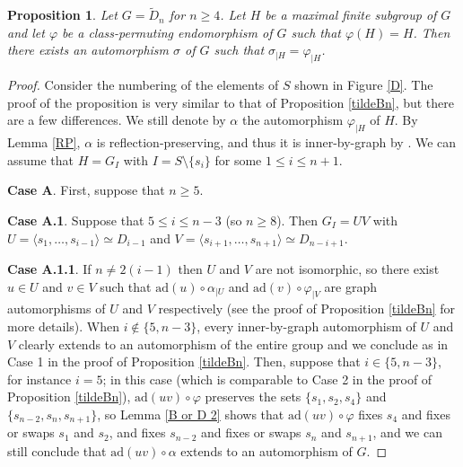 \documentclass[a4paper, 11pt]{amsart}
\newtheorem{prop}[te]{Proposition}
\theoremstyle{definition}
\theoremstyle{remark}
\renewcommand{\leq}{\leqslant}
\renewcommand{\geq}{\geqslant}
\begin{document}

\begin{prop}\label{tildeDn}
Let $G=\tilde{D}_n$ for $n\geq 4$. Let $H$ be a maximal finite subgroup of $G$ and let $\varphi$ be a class-permuting endomorphism of $G$ such that $\varphi(H)=H$. Then there exists an automorphism $\sigma$ of $G$ such that $\sigma_{\vert H}=\varphi_{\vert H}$.
\end{prop}

\begin{proof}
Consider the numbering of the elements of $S$ shown in Figure \ref{D}. The proof of the proposition is very similar to that of Proposition \ref{tildeBn}, but there are a few differences. We still denote by $\alpha$ the automorphism $\varphi_{\vert H}$ of $H$. By Lemma \ref{RP}, $\alpha$ is reflection-preserving, and thus it is inner-by-graph by \cite[Proposition 1.44]{franz}. We can assume that $H=G_I$ with $I= S\setminus \lbrace s_i\rbrace$ for some $1\leq i\leq n+1$. 

\smallskip

\noindent \textbf{Case A}. First, suppose that $n\geq 5$. 

\smallskip

\noindent \textbf{Case A.1}. Suppose that $5\leq i \leq n-3$ (so $n\geq 8$). Then $G_I=UV$ with $U=\langle s_1,\ldots,s_{i-1}\rangle\simeq D_{i-1}$ and $V=\langle s_{i+1},\ldots,s_{n+1}\rangle\simeq D_{n-i+1}$. 

\smallskip

\noindent \textbf{Case A.1.1}. If $n\neq 2(i-1)$ then $U$ and $V$ are not isomorphic, so there exist $u\in U$ and $v\in V$ such that $\mathrm{ad}(u)\circ \alpha_{\vert U}$ and $\mathrm{ad}(v)\circ \varphi_{\vert V}$ are graph automorphisms of $U$ and $V$ respectively (see the proof of Proposition \ref{tildeBn} for more details). When $i\notin \lbrace 5, n-3\rbrace$, every inner-by-graph automorphism of $U$ and $V$ clearly extends to an automorphism of the entire group and we conclude as in Case 1 in the proof of Proposition \ref{tildeBn}. Then, suppose that $i\in \lbrace 5, n-3\rbrace$, for instance $i=5$; in this case (which is comparable to Case 2 in the proof of Proposition \ref{tildeBn}), $\mathrm{ad}(uv)\circ \varphi$ preserves the sets $\lbrace s_1,s_2,s_4\rbrace$ and $\lbrace s_{n-2},s_n,s_{n+1}\rbrace$, so Lemma \ref{B or D 2} shows that $\mathrm{ad}(uv)\circ \varphi$ fixes $s_4$ and fixes or swaps $s_1$ and $s_2$, and fixes $s_{n-2}$ and fixes or swaps $s_n$ and $s_{n+1}$, and we can still conclude that $\mathrm{ad}(uv)\circ \alpha$ extends to an automorphism of $G$.


\end{proof}
\end{document}
